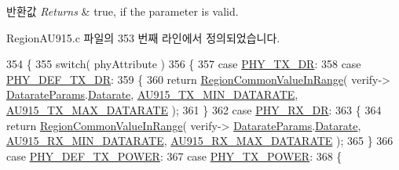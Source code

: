 \begin{DoxyRetVals}{반환값}
{\em Returns} & true, if the parameter is valid. \\
\hline
\end{DoxyRetVals}


Region\+A\+U915.\+c 파일의 353 번째 라인에서 정의되었습니다.


\begin{DoxyCode}
354 \{
355     \textcolor{keywordflow}{switch}( phyAttribute )
356     \{
357         \textcolor{keywordflow}{case} \mbox{\hyperlink{group___r_e_g_i_o_n_gga51cbe8f5433d914fe9cf81b451de2c2da62c19af9dc2c54540562e1158c015f57}{PHY\_TX\_DR}}:
358         \textcolor{keywordflow}{case} \mbox{\hyperlink{group___r_e_g_i_o_n_gga51cbe8f5433d914fe9cf81b451de2c2da70c3923333165960549162e3dcf10467}{PHY\_DEF\_TX\_DR}}:
359         \{
360             \textcolor{keywordflow}{return} \mbox{\hyperlink{group___r_e_g_i_o_n_c_o_m_m_o_n_gafdd1c80d953e18d755a631b72a9c3bd3}{RegionCommonValueInRange}}( verify->
      \mbox{\hyperlink{unionu_verify_params_a92427be16343eb3d9c14334eb95ec058}{DatarateParams}}.\mbox{\hyperlink{structu_verify_params_1_1s_datarate_params_ae2f6080f3aa0e9485c55513ca56bb24d}{Datarate}}, \mbox{\hyperlink{group___r_e_g_i_o_n_a_u915_ga3a7bb744191d2b9daaf6637d36d78422}{AU915\_TX\_MIN\_DATARATE}}, 
      \mbox{\hyperlink{group___r_e_g_i_o_n_a_u915_gada67d69eba43730ad99c2a9f00308257}{AU915\_TX\_MAX\_DATARATE}} );
361         \}
362         \textcolor{keywordflow}{case} \mbox{\hyperlink{group___r_e_g_i_o_n_gga51cbe8f5433d914fe9cf81b451de2c2da8cc3b895173b07ee71127e366c8d0d55}{PHY\_RX\_DR}}:
363         \{
364             \textcolor{keywordflow}{return} \mbox{\hyperlink{group___r_e_g_i_o_n_c_o_m_m_o_n_gafdd1c80d953e18d755a631b72a9c3bd3}{RegionCommonValueInRange}}( verify->
      \mbox{\hyperlink{unionu_verify_params_a92427be16343eb3d9c14334eb95ec058}{DatarateParams}}.\mbox{\hyperlink{structu_verify_params_1_1s_datarate_params_ae2f6080f3aa0e9485c55513ca56bb24d}{Datarate}}, \mbox{\hyperlink{group___r_e_g_i_o_n_a_u915_ga6c3e760e2bc555e4d608ff12d14f6652}{AU915\_RX\_MIN\_DATARATE}}, 
      \mbox{\hyperlink{group___r_e_g_i_o_n_a_u915_ga5ce832bce671573a6b6bb4a8358b250e}{AU915\_RX\_MAX\_DATARATE}} );
365         \}
366         \textcolor{keywordflow}{case} \mbox{\hyperlink{group___r_e_g_i_o_n_gga51cbe8f5433d914fe9cf81b451de2c2da18ae0d314f20c212f9e40207099ab1bb}{PHY\_DEF\_TX\_POWER}}:
367         \textcolor{keywordflow}{case} \mbox{\hyperlink{group___r_e_g_i_o_n_gga51cbe8f5433d914fe9cf81b451de2c2da0dceb30b79f1bae301afd5406a86d6f3}{PHY\_TX\_POWER}}:
368         \{

\end{DoxyCode}
